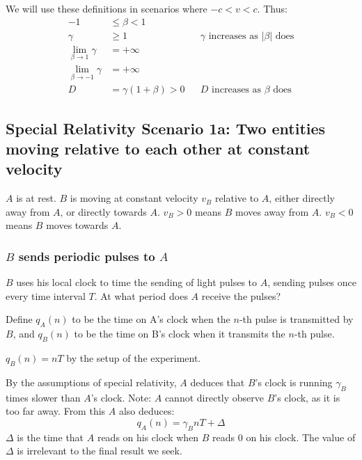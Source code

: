 \documentclass[a4paper]{article}
\theoremstyle{plain}
\theoremstyle{definition}
\begin{document}
We will use these definitions in scenarios where $-c < v < c$.
Thus:
\begin{align}
-1 & \leq \beta < 1 \nonumber \\
\gamma & \geq 1 & & \text{$\gamma$ increases as $|\beta|$ does} \nonumber \\
\lim_{\beta \rightarrow 1} \gamma & = +\infty \nonumber \\
\lim_{\beta \rightarrow -1} \gamma & = +\infty \nonumber \\
D & = \gamma (1+\beta) > 0 & & \text{$D$ increases as $\beta$ does} \label{eqn:DaltFormula}
\end{align}


\subsection{Special Relativity Scenario 1a: Two entities moving relative to each other at constant velocity}
\label{sec:scen1a}

$A$ is at rest.  $B$ is moving at constant velocity $v_B$ relative to $A$,
either directly away from $A$, or directly towards $A$.
$v_B > 0$ means $B$ moves away from $A$.
$v_B < 0$ means $B$ moves towards $A$.


\subsubsection{$B$ sends periodic pulses to $A$}
\label{sec:scen1a-BtoA}

$B$ uses his local clock to time the sending of light pulses to $A$,
sending pulses once every time interval $T$.
At what period does $A$ receive the pulses?

Define $q_A(n)$ to be the time on A's clock when the $n$-th pulse is
transmitted by $B$, and $q_B(n)$ to be the time on B's clock when it
transmits the $n$-th pulse.

$q_B(n) = nT$ by the setup of the experiment.

By the assumptions of special relativity, $A$ deduces that $B$'s clock
is running $\gamma_B$ times slower than $A$'s clock.  Note: $A$ cannot
directly observe $B$'s clock, as it is too far away.  From this $A$
also deduces:
\begin{equation}
q_A(n) = \gamma_B nT + \Delta  \label{eqn:scen1a-timeA}
\end{equation}
$\Delta$ is the time that $A$ reads on his clock
when $B$ reads 0 on his clock.  The value of $\Delta$
is irrelevant to the final result we seek.
\end{document}
